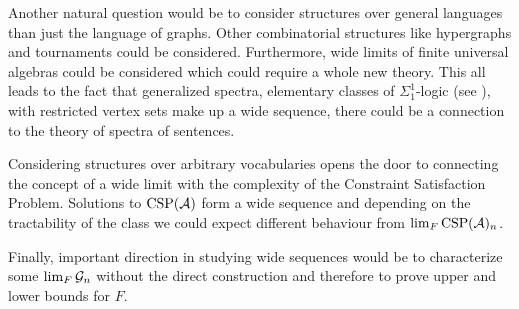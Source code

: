 Another natural question would be to consider structures over general languages than just the language of graphs. Other combinatorial structures like hypergraphs and tournaments could be considered. Furthermore, wide limits of finite universal algebras could be considered which could require a whole new theory. This all leads to the fact that generalized spectra, elementary classes of $\Sigma_1^1$-logic (see \cite{Fagin74}), with restricted vertex sets make up a wide sequence, there could be a connection to the theory of spectra of sentences.


Considering structures over arbitrary vocabularies opens the door to connecting the concept of a wide limit with the complexity of the Constraint Satisfaction Problem. Solutions to $\text{CSP}(\mathcal{A})$ form a wide sequence and depending on the tractability of the class we could expect different behaviour from $\lim_{F}\text{CSP}(\mathcal{A})_n$.

Finally, important direction in studying wide sequences would be to characterize some $\lim_F\mathcal{G}_n$ without the direct construction and therefore to prove upper and lower bounds for $F$.
